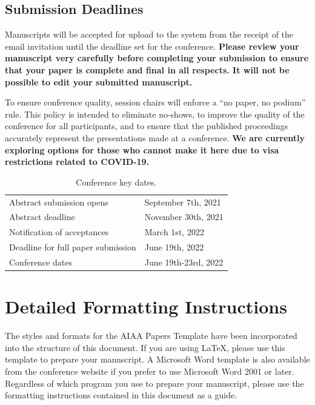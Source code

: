 \documentclass[conf]{new-aiaa}
\begin{document}
    \subsection{Submission Deadlines}

    Manuscripts will be accepted for upload to the system from the receipt of the email invitation until the deadline set for the conference. \textbf{Please review your manuscript very carefully before completing your submission to ensure that your paper is complete and final in all respects. It will not be possible to edit your submitted manuscript.}
    
    To ensure conference quality, session chairs will enforce a ``no paper, no podium'' rule. This policy is intended to eliminate no-shows, to improve the quality of the conference for all participants, and to ensure that the published proceedings accurately represent the presentations made at a conference. \textbf{We are currently exploring options for those who cannot make it here due to visa restrictions related to COVID-19.}
    
    \begin{table}[h]
        \centering
        \caption{Conference key dates.}
        \begin{tabular}{ll}
            \hline
            Abstract submission opens & September 7th, 2021\\
            Abstract deadline & November 30th, 2021\\
            Notification of acceptances & March 1st, 2022\\
            Deadline for full paper submission & June 19th, 2022\\
            Conference dates & June 19th-23rd, 2022\\\hline
        \end{tabular}
        \label{tab:my_label}
    \end{table}
    
    \section{Detailed Formatting Instructions}

    The styles and formats for the AIAA Papers Template have been incorporated into the structure of this document. If you are using \LaTeX{}, please use this template to prepare your manuscript. A Microsoft Word template is also available from the conference website if you prefer to use Microsoft Word 2001 or later. Regardless of which program you use to prepare your manuscript, please use the formatting instructions contained in this document as a guide.
    
\end{document}
